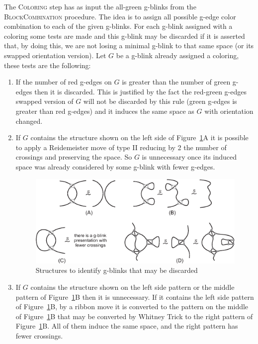 The \textsc{Coloring} step has as input the  all-green
g-blinks from the \textsc{BlockCombination} procedure.
The idea is to assign all possible g-edge color combination
to each of the given g-blinks. For each g-blink assigned
with a coloring some tests are made and this g-blink may
be discarded if it is asserted that, by doing this, we are
not losing a minimal g-blink to that same space (or its swapped
orientation version). Let $G$ be a g-blink already assigned
a coloring, these tests are the following:
\begin{enumerate}
\item If the number of red g-edges on $G$ is greater than the
number of green g-edges then it is discarded. This is
justified by the fact the red-green g-edges swapped version of $G$
will not be discarded by this rule (green g-edges is greater than
red g-edges) and it induces the same space as $G$ with orientation
changed.

\item If $G$ contains the structure shown
on the left side of Figure~\ref{fig:unecessaryGBlinkStructure}A it
is possible to apply a Reidemeister move of type II reducing by 2
the number of crossings and preserving the space. So $G$ is
unnecessary once its induced space was already considered by some
g-blink with fewer g-edges.

\begin{figure}[htp]
   \begin{center}
      \leavevmode
      \includegraphics[width=12cm]{A.figs/unnecessarygblinkstructure.eps}
   \end{center}
   \vspace{-0.7cm}
   \caption{ Structures to identify g-blinks that may be discarded}
   \label{fig:unecessaryGBlinkStructure}
\end{figure}

\item If $G$ contains the structure shown
on the left side pattern or the middle pattern of
Figure~\ref{fig:unecessaryGBlinkStructure}B then it is unnecessary.
If it contains the left side pattern of
Figure~\ref{fig:unecessaryGBlinkStructure}B, by a ribbon move it is
converted to the pattern on the middle of
Figure~\ref{fig:unecessaryGBlinkStructure}B that may be converted by
Whitney Trick to the right pattern of
Figure~\ref{fig:unecessaryGBlinkStructure}B. All of them induce the
same space, and the right pattern has fewer crossings.


\end{enumerate}
